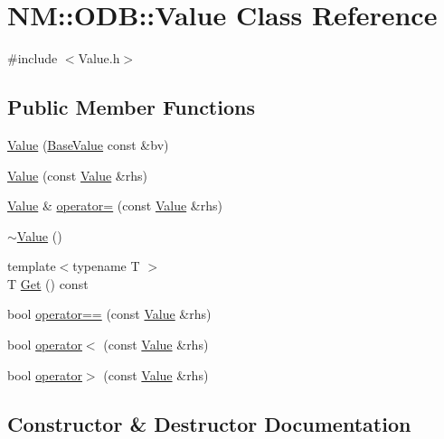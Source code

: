 \hypertarget{class_n_m_1_1_o_d_b_1_1_value}{}\section{N\+M\+:\+:O\+D\+B\+:\+:Value Class Reference}
\label{class_n_m_1_1_o_d_b_1_1_value}


{\ttfamily \#include $<$Value.\+h$>$}

\subsection*{Public Member Functions}
\begin{DoxyCompactItemize}
\item 
\hyperlink{class_n_m_1_1_o_d_b_1_1_value_aff9458b1709a5a8e4cb533009a60c872}{Value} (\hyperlink{class_n_m_1_1_o_d_b_1_1_base_value}{Base\+Value} const \&bv)
\item 
\hyperlink{class_n_m_1_1_o_d_b_1_1_value_af54d981ec82cdf060be9e2bf09895c4c}{Value} (const \hyperlink{class_n_m_1_1_o_d_b_1_1_value}{Value} \&rhs)
\item 
\hyperlink{class_n_m_1_1_o_d_b_1_1_value}{Value} \& \hyperlink{class_n_m_1_1_o_d_b_1_1_value_a230d165d17cb0a6d7f658f052eef4b2c}{operator=} (const \hyperlink{class_n_m_1_1_o_d_b_1_1_value}{Value} \&rhs)
\item 
\hyperlink{class_n_m_1_1_o_d_b_1_1_value_a89465dc415cf1e79bdfb661aa038eda0}{$\sim$\+Value} ()
\item 
{\footnotesize template$<$typename T $>$ }\\T \hyperlink{class_n_m_1_1_o_d_b_1_1_value_a274f294d919e7baba602d42d65c1e3a8}{Get} () const 
\item 
bool \hyperlink{class_n_m_1_1_o_d_b_1_1_value_a3c8038dd797e998e49931ea25ee5a1d2}{operator==} (const \hyperlink{class_n_m_1_1_o_d_b_1_1_value}{Value} \&rhs)
\item 
bool \hyperlink{class_n_m_1_1_o_d_b_1_1_value_ad4017a9ca04a72d93963c3a2d030c1da}{operator$<$} (const \hyperlink{class_n_m_1_1_o_d_b_1_1_value}{Value} \&rhs)
\item 
bool \hyperlink{class_n_m_1_1_o_d_b_1_1_value_aa73e9b2f51907a0ce259bf35cc677479}{operator$>$} (const \hyperlink{class_n_m_1_1_o_d_b_1_1_value}{Value} \&rhs)
\end{DoxyCompactItemize}


\subsection{Constructor \& Destructor Documentation}
\hypertarget{class_n_m_1_1_o_d_b_1_1_value_aff9458b1709a5a8e4cb533009a60c872}{}
